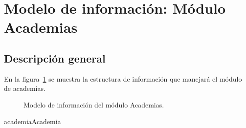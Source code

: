 
%


\section{Modelo de información: Módulo Academias}
\subsection{Descripción general}
En la figura~\ref{fig:academias} se muestra la estructura de información que manejará el módulo de academias.

\begin{figure}[htbp!]
	\begin{center}
		\caption{Modelo de información del módulo Academias.}
		\label{fig:academias}
	\end{center}
\end{figure}

\begin{BusinessEntity}{academia}{Academia}
	

\end{BusinessEntity}


